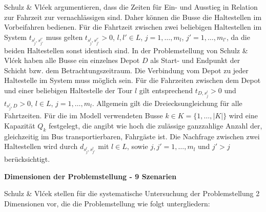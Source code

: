 Schulz \& Vlćek argumentieren, dass die Zeiten für Ein- und Ausstieg in Relation zur Fahrzeit zur vernachlässigen sind. Daher können die Busse die Haltestellen im Vorbeifahren bedienen.
Für die Fahrtzeit zwischen zwei beliebigen Haltestellen im System $t_{s^l_j, s^{l'}_{j'}}$ muss gelten $t_{s^l_j, s^{l'}_{j'}}> 0$, $l, l' \in L$, $j = 1, \dots, m_l$, $j' = 1, \dots, m_{l'}$, da die beiden Haltestellen sonst identisch sind.
In der Problemstellung von Schulz \& Vlćek haben alle Busse ein einzelnes Depot $D$ als Start- und Endpunkt der Schicht bzw. dem Betrachtungszeitraum. Die Verbindung vom Depot zu jeder Haltestelle im System muss möglich sein. Für die Fahrzeiten zwischen dem Depot und einer beliebigen Haltestelle der Tour $l$ gilt entsprechend $t_{D, s^l_j} > 0$ und $t_{s^l_j, D} > 0$, $l \in L$, $j = 1, \dots, m_l$. Allgemein gilt die Dreiecksungleichung für alle Fahrtzeiten.
Für die im Modell verwendeten Busse $k \in K = \{1, \dots, |K|\}$ wird eine Kapazität $Q_k$ festgelegt, die angibt wie hoch die zulässige ganzzahlige Anzahl der, gleichzeitig im Bus transportierbaren, Fahrgäste ist.
Die Nachfrage zwischen zwei Haltestellen wird durch $d_{s^l_j, s^l_{j'}}$ mit $l \in L$, sowie $j, j' = 1, \dots, m_l$ und $j' > j$ berücksichtigt.


\textbf{Dimensionen der Problemstellung - 9 Szenarien}

Schulz \& Vlćek stellen für die systematische Untersuchung der Problemstellung 2 Dimensionen vor, die die Problemstellung wie folgt untergliedern:

